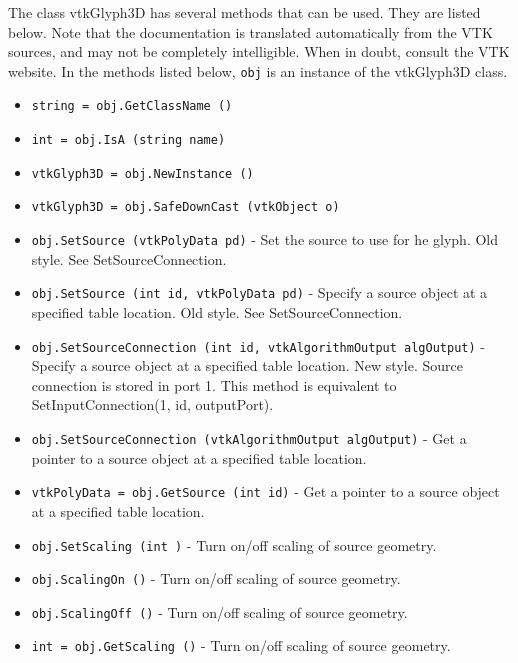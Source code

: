 The class vtkGlyph3D has several methods that can be used.
  They are listed below.
Note that the documentation is translated automatically from the VTK sources,
and may not be completely intelligible.  When in doubt, consult the VTK website.
In the methods listed below, \verb|obj| is an instance of the vtkGlyph3D class.
\begin{itemize}
\item  \verb|string = obj.GetClassName ()|

\item  \verb|int = obj.IsA (string name)|

\item  \verb|vtkGlyph3D = obj.NewInstance ()|

\item  \verb|vtkGlyph3D = obj.SafeDownCast (vtkObject o)|

\item  \verb|obj.SetSource (vtkPolyData pd)| -  Set the source to use for he glyph. Old style. See SetSourceConnection.

\item  \verb|obj.SetSource (int id, vtkPolyData pd)| -  Specify a source object at a specified table location.
 Old style. See SetSourceConnection.

\item  \verb|obj.SetSourceConnection (int id, vtkAlgorithmOutput algOutput)| -  Specify a source object at a specified table location. New style.
 Source connection is stored in port 1. This method is equivalent
 to SetInputConnection(1, id, outputPort).

\item  \verb|obj.SetSourceConnection (vtkAlgorithmOutput algOutput)| -  Get a pointer to a source object at a specified table location.

\item  \verb|vtkPolyData = obj.GetSource (int id)| -  Get a pointer to a source object at a specified table location.

\item  \verb|obj.SetScaling (int )| -  Turn on/off scaling of source geometry.

\item  \verb|obj.ScalingOn ()| -  Turn on/off scaling of source geometry.

\item  \verb|obj.ScalingOff ()| -  Turn on/off scaling of source geometry.

\item  \verb|int = obj.GetScaling ()| -  Turn on/off scaling of source geometry.


\end{itemize}
